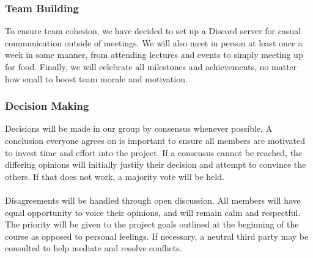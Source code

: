 \documentclass{article}
\begin{document}



\subsubsection*{Team Building}

To ensure team cohesion, we have decided to set up a Discord server for casual communication outside of meetings. We will also meet in person at least once a week in some manner, from attending lectures and events to simply meeting up for food. Finally, we will celebrate all milestones and achievements, no matter how small to boost team morale and motivation.

\subsubsection*{Decision Making}

Decisions will be made in our group by consensus whenever possible. A conclusion everyone agrees on is important to ensure all members are motivated to invest time and effort into the project. If a consensus cannot be reached, the differing opinions will initially justify their decision and attempt to convince the others. If that does not work, a majority vote will be held.\\\\ Disagreements will be handled through open discussion. All members will have equal opportunity to voice their opinions, and will remain calm and respectful. The priority will be given to the project goals outlined at the beginning of the course as opposed to personal feelings. If necessary, a neutral third party may be consulted to help mediate and resolve conflicts.
\end{document}
